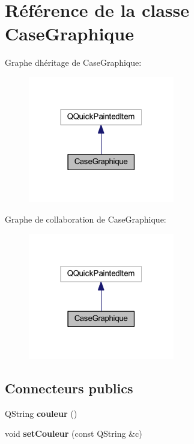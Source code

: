 \hypertarget{class_case_graphique}{}\section{Référence de la classe Case\+Graphique}
\label{class_case_graphique}


Graphe d\textquotesingle{}héritage de Case\+Graphique\+:
\nopagebreak
\begin{figure}[H]
\begin{center}
\leavevmode
\includegraphics[width=181pt]{class_case_graphique__inherit__graph}
\end{center}
\end{figure}


Graphe de collaboration de Case\+Graphique\+:
\nopagebreak
\begin{figure}[H]
\begin{center}
\leavevmode
\includegraphics[width=181pt]{class_case_graphique__coll__graph}
\end{center}
\end{figure}
\subsection*{Connecteurs publics}
\begin{DoxyCompactItemize}
\item 
Q\+String {\bfseries couleur} ()\hypertarget{class_case_graphique_af731c72922e130f5a64c999badc03634}{}\label{class_case_graphique_af731c72922e130f5a64c999badc03634}

\item 
void {\bfseries set\+Couleur} (const Q\+String \&c)\hypertarget{class_case_graphique_a59b298e66484cfe89f62917f1f9b269b}{}\label{class_case_graphique_a59b298e66484cfe89f62917f1f9b269b}

\end{DoxyCompactItemize}
